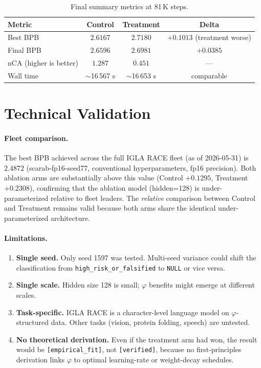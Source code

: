 \documentclass[11pt,a4paper]{article}
\begin{document}
\begin{table}[htbp]
\centering
\caption{Final summary metrics at 81\,K steps.}
\label{tab:final}
\begin{tabular}{@{}lccc@{}}
\toprule
Metric & Control & Treatment & Delta \\
\midrule
Best BPB & $\mathbf{2.6167}$ & $2.7180$ & $+0.1013$ (treatment worse) \\
Final BPB & $2.6596$ & $2.6981$ & $+0.0385$ \\
nCA (higher is better) & $1.287$ & $0.451$ & --- \\
Wall time & $\sim$16\,567 s & $\sim$16\,653 s & comparable \\
\bottomrule
\end{tabular}
\end{table}

\section{Technical Validation}

\paragraph{Fleet comparison.}  The best BPB achieved across the full
IGLA RACE fleet (as of 2026-05-31) is $2.4872$
(scarab-fp16-seed77, conventional hyperparameters, fp16 precision).
Both ablation arms are substantially above this value (Control $+0.1295$,
Treatment $+0.2308$), confirming that the ablation model (hidden=128) is
under-parameterized relative to fleet leaders.  The \emph{relative}
comparison between Control and Treatment remains valid because both arms
share the identical under-parameterized architecture.

\paragraph{Limitations.}
\begin{enumerate}
  \item \textbf{Single seed.} Only seed 1597 was tested.  Multi-seed
    variance could shift the classification from
    \texttt{high\_risk\_or\_falsified} to \texttt{NULL} or vice versa.
  \item \textbf{Single scale.}  Hidden size 128 is small; $\varphi$
    benefits might emerge at different scales.
  \item \textbf{Task-specific.}  IGLA RACE is a character-level language
    model on $\varphi$-structured data.  Other tasks (vision, protein
    folding, speech) are untested.
  \item \textbf{No theoretical derivation.}  Even if the treatment arm
    had won, the result would be \texttt{[empirical\_fit]}, not
    \texttt{[verified]}, because no first-principles derivation links
    $\varphi$ to optimal learning-rate or weight-decay schedules.
\end{enumerate}
\end{document}
